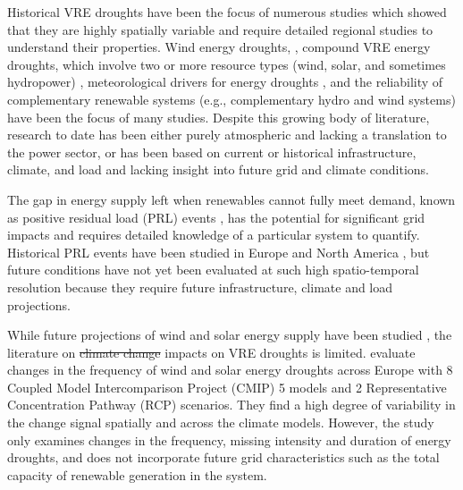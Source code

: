 \documentclass{agujournal2019}
\providecommand{\DIFadd}[1]{{\protect\color{blue}\uwave{#1}}} %
\providecommand{\DIFdel}[1]{{\protect\color{red}\sout{#1}}} %
\providecommand{\DIFaddbegin}{} %
\providecommand{\DIFaddend}{} %
\providecommand{\DIFdelbegin}{} %
\providecommand{\DIFdelend}{} %
\begin{document}
Historical VRE droughts have been the focus of numerous studies which showed that they are highly spatially variable and require detailed regional studies to understand their properties. Wind energy droughts, \cite{Cannon_2015, Potisomporn_2021, Potisomporn_2023, Potisomporn_2024, Abdelaziz_2024, Leahy_2012, Patlakas_2017, Ohlendorf_2020, Kay_2023}, compound VRE energy droughts, which involve two or more resource types (wind, solar, and sometimes hydropower) \cite{Gburcik2013,Otero2022,Bloomfield2020b,Bett2016,Otero2022a,Raynaud2018,Miglietta2017,Bloomfield2020c,Francois2016c,van_der_Wiel_2019a,GonzalezSalazar2022,FerrazdeAndradeSantos2020a,Bloomfield2022,Brown2021,Doering2018,Rinaldi2021,Amonkar2022,Bracken2024,Zheng_2024}, meteorological drivers for energy droughts \cite{Tong2021,Engeland2017a,Mohammadi2018,Lledo2018,van_der_Wiel_2019a,van_der_Wiel_2019b}, and the reliability of complementary renewable systems (e.g., complementary hydro and wind systems) \cite{Jurasz2018,Solomon2016,Potrc2022} have been the focus of many studies. Despite this growing body of literature, research to date has been either purely atmospheric and lacking a translation to the power sector, or has been based on current or historical infrastructure, climate, and load and lacking insight into future grid and climate conditions. 

The gap in energy supply left when renewables cannot fully meet demand, known as positive residual load (PRL) events \cite{Kittel2024}, has the potential for significant grid impacts and requires detailed knowledge of a particular system to quantify. Historical PRL events have been studied in Europe \cite{Raynaud2018, Otero2022, Otero2022a, Fran_ois_2022,Ruhnau_2022, van_der_Wiel_2019a, van_der_Wiel_2019b} and North America \cite{Rinaldi2021, Bracken2024}, but future conditions have not yet been evaluated at such high spatio-temporal resolution because they require future infrastructure, climate and load projections. 

While future projections of wind and solar energy supply have been studied \cite{Jung_2022,Dutta_2022,Gernaat_2021}, the literature on \DIFdelbegin \DIFdel{climate change }\DIFdelend \DIFaddbegin \DIFadd{future }\DIFaddend impacts on VRE droughts is limited.  evaluate changes in the frequency of wind and solar energy droughts across Europe with 8 Coupled Model Intercomparison Project (CMIP) 5 models and 2 Representative Concentration Pathway (RCP) scenarios. They find a high degree of variability in the change signal spatially and across the climate models. However, the study only examines changes in the frequency, missing intensity and duration of energy droughts, and does not incorporate future grid characteristics such as the total capacity of renewable generation in the system. 
\end{document}
